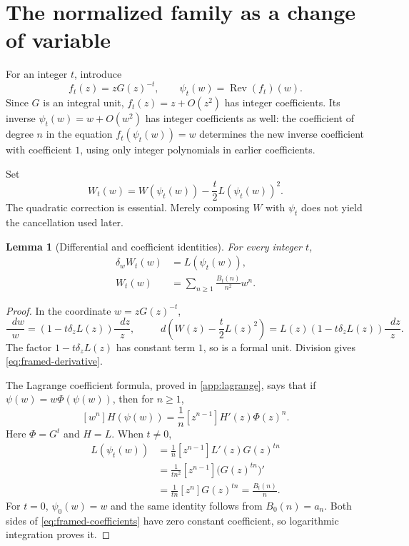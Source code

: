 \documentclass[11pt,letterpaper]{article}
\numberwithin{equation}{section}
\newtheorem{lemma}[lemma]{Lemma}
\theoremstyle{definition}
\theoremstyle{remark}
\newcommand{\Rev}{\operatorname{Rev}}
\newcommand{\dd}{\mathop{}\!d}
\begin{document}
\section{The normalized family as a change of variable}\label{sec:lagrange}
For an integer $t$, introduce
\begin{equation}\label{eq:coordinate}
 f_t(z)=zG(z)^{-t},\qquad
 \psi_t(w)=\Rev(f_t)(w).
\end{equation}
Since $G$ is an integral unit, $f_t(z)=z+O(z^2)$ has integer coefficients.
Its inverse $\psi_t(w)=w+O(w^2)$ has integer coefficients as well: the
coefficient of degree $n$ in the equation $f_t(\psi_t(w))=w$ determines
the new inverse coefficient with coefficient $1$, using only integer
polynomials in earlier coefficients.

Set
\begin{equation}\label{eq:framed-potential}
 W_t(w)=W(\psi_t(w))-\frac t2L(\psi_t(w))^2.
\end{equation}
The quadratic correction is essential. Merely composing $W$ with
$\psi_t$ does not yield the cancellation used later.

\begin{lemma}[Differential and coefficient identities]\label{lem:lagrange}
For every integer $t$,
\begin{align}
 \delta_wW_t(w)&=L(\psi_t(w)),\label{eq:framed-derivative}\\
 W_t(w)&=\sum_{n\ge1}\frac{B_t(n)}{n^2}w^n.\label{eq:framed-coefficients}
\end{align}
\end{lemma}
\begin{proof}
In the coordinate $w=zG(z)^{-t}$,
\[
 \frac{\dd w}{w}=(1-t\delta_zL(z))\frac{\dd z}{z},
 \qquad
 \dd\left(W(z)-\frac t2L(z)^2\right)
 =L(z)(1-t\delta_zL(z))\frac{\dd z}{z}.
\]
The factor $1-t\delta_zL(z)$ has constant term $1$, so is a formal unit.
Division gives \eqref{eq:framed-derivative}.

The Lagrange coefficient formula, proved in \cref{app:lagrange}, says that
if $\psi(w)=w\Phi(\psi(w))$, then for $n\ge1$,
\begin{equation}\label{eq:lagrange}
 [w^n]H(\psi(w))=\frac1n[z^{n-1}]H'(z)\Phi(z)^n.
\end{equation}
Here $\Phi=G^t$ and $H=L$. When $t\ne0$,
\begin{align*}
 [w^n]L(\psi_t(w))
 &=\frac1n[z^{n-1}]L'(z)G(z)^{tn}\\
 &=\frac1{tn^2}[z^{n-1}]\bigl(G(z)^{tn}\bigr)'\\
 &=\frac1{tn}[z^n]G(z)^{tn}=\frac{B_t(n)}n.
\end{align*}
For $t=0$, $\psi_0(w)=w$ and the same identity follows from
$B_0(n)=a_n$. Both sides of \eqref{eq:framed-coefficients} have zero
constant coefficient, so logarithmic integration proves it.
\end{proof}
\end{document}
